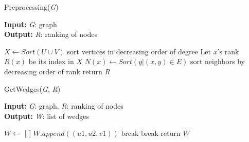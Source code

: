 \documentclass[11pt]{article}
\begin{document}
\begin{algorithm}[H]
\caption{Preprocessing(\textit{G})}
\hspace*{\algorithmicindent} \textbf{Input:} \textit{G}: graph \\
\hspace*{\algorithmicindent} \textbf{Output:} \textit{R}: ranking of nodes
\begin{algorithmic}[1]
    \State $X \gets Sort(U \cup V)$ \Comment sort vertices in decreasing order of degree
    \State Let $x$'s rank $R(x)$ be its index in $X$
        \State $N(x) \gets Sort({y | (x, y) \in E})$ \Comment sort neighbors by decreasing order of rank
    \EndFor
    \State return $R$
\end{algorithmic}
\end{algorithm}

\begin{algorithm}[H]
\caption{GetWedges(\textit{G}, \textit{R})}
\hspace*{\algorithmicindent} \textbf{Input:} \textit{G}: graph, \textit{R}: ranking of nodes \\
\hspace*{\algorithmicindent} \textbf{Output:} \textit{W}: list of wedges
\begin{algorithmic}[1]
    \State $W \gets$ [ ]
                        \State $W.append((u1, u2, v1))$
                    \Else
                        \State break
                    \EndIf
                \EndFor
            \Else
                \State break
            \EndIf
        \EndFor
    \EndFor
    \State return $W$
\end{algorithmic}
\end{algorithm}
\end{document}
